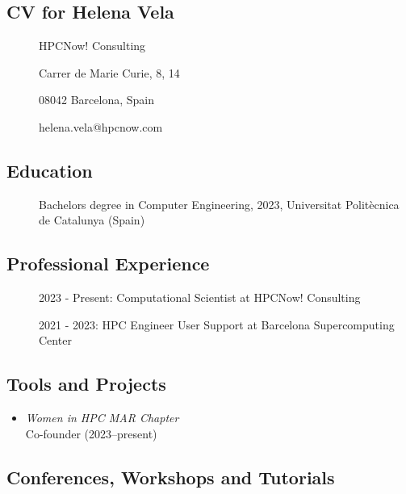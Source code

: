 
\subsection{CV for Helena Vela}
\begin{description}
\item[] HPCNow! Consulting
\item[] Carrer de Marie Curie, 8, 14
\item[] 08042 Barcelona, Spain
\item[] helena.vela@hpcnow.com
\end{description}

\subsection*{Education}
\begin{description}
    \item[] Bachelors degree in Computer Engineering, 2023, Universitat Politècnica de Catalunya (Spain)
\end{description}

\subsection*{Professional Experience}
\begin{description}
    \item[] 2023 - Present: Computational Scientist at HPCNow! Consulting
    \item[] 2021 - 2023: HPC Engineer User Support at Barcelona Supercomputing Center 
\end{description}

\subsection*{Tools and Projects}

\begin{itemize}
    \item[] \emph{Women in HPC MAR Chapter}
        \\Co-founder (2023--present)
\end{itemize}


\subsection*{Conferences, Workshops and Tutorials}

